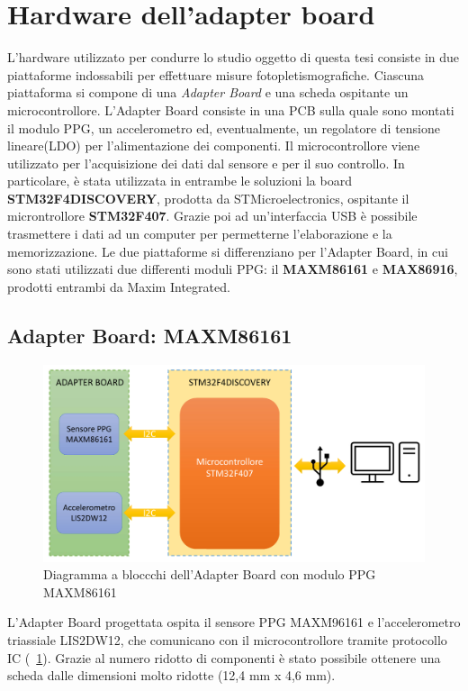 \section{Hardware dell'adapter board}
L'hardware utilizzato per condurre lo studio oggetto di questa tesi consiste in due piattaforme indossabili per effettuare misure fotopletismografiche. Ciascuna piattaforma si compone di una \textit{Adapter Board} e una scheda ospitante un microcontrollore. L'Adapter Board consiste in una PCB sulla quale sono montati il modulo PPG, un accelerometro ed, eventualmente, un regolatore di tensione lineare(LDO) per l'alimentazione dei componenti. Il microcontrollore viene utilizzato per l'acquisizione dei dati dal sensore e per il suo controllo. In particolare, è stata utilizzata in entrambe le soluzioni la board \textbf{STM32F4DISCOVERY}, prodotta da STMicroelectronics, ospitante il microntrollore \textbf{STM32F407}. Grazie poi ad un'interfaccia USB è possibile trasmettere i dati ad un computer per permetterne l'elaborazione e la memorizzazione.
Le due piattaforme si differenziano per l'Adapter Board, in cui sono stati utilizzati due differenti moduli PPG: il \textbf{MAXM86161} e \textbf{MAX86916}, prodotti entrambi da Maxim Integrated.
\subsection{Adapter Board: MAXM86161}
\begin{figure}[b]
	\centering
	\includegraphics[width=0.6\linewidth]{ImageFiles/Hardware/DiagrammaBlocchiMAXM86161}
	\caption{Diagramma a bloccchi dell'Adapter Board con modulo PPG MAXM86161}
	\label{fig:DiagrammaBlocchiMAXM86161}
\end{figure}
L'Adapter Board progettata ospita il sensore PPG MAXM96161 e l'accelerometro triassiale LIS2DW12, che comunicano con il microcontrollore tramite protocollo IC (\Fig~\ref{fig:DiagrammaBlocchiMAXM86161}). Grazie al numero ridotto di componenti è stato possibile ottenere una scheda dalle dimensioni molto ridotte (12,4 mm x 4,6 mm).

